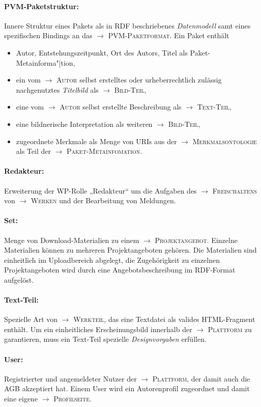\documentclass[a4paper,11pt]{article}
\newcommand{\glossar}[1]{{$\to$ \textsc{#1}}}
\begin{document}
\paragraph{PVM-Paketstruktur:}
Innere Struktur eines Pakets als in RDF beschriebenes \emph{Datenmodell} samt
eines spezifischen Bindings an das \glossar{PVM-Paketformat}.  Ein Paket
enthält
\begin{itemize}
\item Autor, Entstehungszeitpunkt, Ort des Autors, Titel als
  Paket-Metainforma"|tion,
\item ein vom \glossar{Autor} selbst erstelltes oder urheberrechtlich zulässig
  nachgenutztes \emph{Titelbild} als \glossar{Bild-Teil},
\item eine vom \glossar{Autor} selbst erstellte Beschreibung als
  \glossar{Text-Teil},
\item eine bildnerische Interpretation als weiteren \glossar{Bild-Teil},
\item zugeordnete Merkmale als Menge von URIs aus der
  \glossar{Merkmalsontologie} als Teil der \glossar{Paket-Metainfomation}.
\end{itemize}

\paragraph{Redakteur:} 
Erweiterung der WP-Rolle „Redakteur“ um die Aufgaben des
\glossar{Freischaltens} von \glossar{Werken} und der Bearbeitung von Meldungen.

\paragraph{Set:} 
Menge von Download-Materialien zu einem \glossar{Projektangebot}.  Einzelne
Materialien können zu mehreren Projektangeboten gehören.  Die Materialien sind
einheitlich im Uploadbereich abgelegt, die Zugehörigkeit zu einzelnen
Projektangeboten wird durch eine Angebotsbeschreibung im RDF-Format aufgelöst.

\paragraph{Text-Teil:}
Spezielle Art von \glossar{Werkteil}, das eine Textdatei als valides
HTML-Fragment enthält.  Um ein einheitliches Erscheinungsbild innerhalb der
\glossar{Plattform} zu garantieren, muss ein Text-Teil spezielle
\emph{Designvorgaben} erfüllen.

\paragraph{User:} 
Registrierter und angemeldeter Nutzer der \glossar{Plattform}, der damit auch
die AGB akzeptiert hat. Einem User wird ein Autorenprofil zugeordnet und damit
eine eigene \glossar{Profilseite}.
\end{document}
